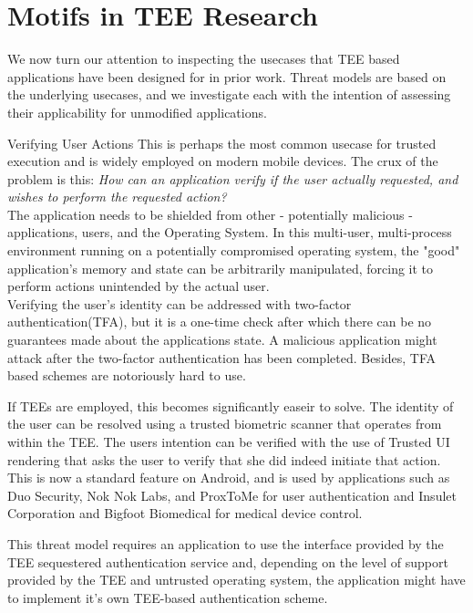 \chapter{Motifs in TEE Research}
\label{motifs}
We now turn our attention to inspecting the usecases that TEE based applications
have been designed for in prior work. Threat models are based on the underlying
usecases, and we investigate each with the intention of assessing their
applicability for unmodified applications. 
    
\begin{subsection}{Verifying User Actions}
This is perhaps the most common usecase for trusted execution and is widely
employed on modern mobile devices. The crux of the problem is this: \emph{How
can an application verify if the user actually requested, and wishes to perform
the requested action?} \\
The application needs to be shielded from other - potentially malicious -
applications, users, and the Operating System. In this multi-user, multi-process
environment running on a potentially compromised operating system, the "good"
application's memory and state can be arbitrarily manipulated, forcing it to
perform actions unintended by the actual user. \\
Verifying the user's identity can be addressed with two-factor
authentication(TFA), but it is a one-time check after which there can be no
guarantees  made about the applications state. A malicious application might
attack after the two-factor authentication has been completed. Besides, TFA
based schemes are notoriously hard to use\cite{herley2011research}. 

If TEEs are employed, this becomes significantly easeir to solve. The identity
of the user can be resolved using a trusted biometric scanner that operates from
within the TEE. The users intention can be verified with the use of Trusted UI
rendering that asks the user to verify that she did indeed initiate that action.
This is now a standard feature on Android\cite{androiddevelopersblog_2018}, and
is used by applications such as Duo Security, Nok Nok Labs, and ProxToMe for
user authentication and Insulet Corporation and Bigfoot Biomedical for medical
device control\cite{androiddevelopersblog_2018}. 

This threat model requires an application to use the interface provided by the
TEE sequestered authentication service and, depending on the level of support
provided by the TEE and untrusted operating system, the application might have
to implement it's own TEE-based authentication scheme\cite{liu2014veriui}. 

\end{subsection}

